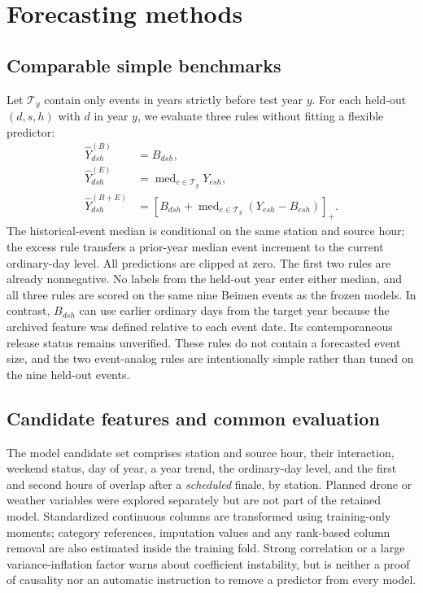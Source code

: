 \section{Forecasting methods}
\subsection{Comparable simple benchmarks}
Let $\mathcal T_y$ contain only events in years strictly before test year $y$. For each held-out $(d,s,h)$ with $d$ in year $y$, we evaluate three rules without fitting a flexible predictor:
\begin{align}
\widehat Y^{(B)}_{dsh}&=B_{dsh}, \label{eq:baseordinary}\\
\widehat Y^{(E)}_{dsh}&=\operatorname{med}_{e\in\mathcal T_y}Y_{esh}, \label{eq:baseevent}\\
\widehat Y^{(B+E)}_{dsh}&=
\left[B_{dsh}+\operatorname{med}_{e\in\mathcal T_y}
  (Y_{esh}-B_{esh})\right]_+ . \label{eq:baseincrement}
\end{align}
The historical-event median is conditional on the same station and source hour; the excess rule transfers a prior-year median event increment to the current ordinary-day level. All predictions are clipped at zero. The first two rules are already nonnegative. No labels from the held-out year enter either median, and all three rules are scored on the same nine Beimen events as the frozen models. In contrast, $B_{dsh}$ can use earlier ordinary days from the target year because the archived feature was defined relative to each event date. Its contemporaneous release status remains unverified. These rules do not contain a forecasted event size, and the two event-analog rules are intentionally simple rather than tuned on the nine held-out events.

\subsection{Candidate features and common evaluation}
The model candidate set comprises station and source hour, their interaction, weekend status, day of year, a year trend, the ordinary-day level, and the first and second hours of overlap after a \emph{scheduled} finale, by station. Planned drone or weather variables were explored separately but are not part of the retained model. Standardized continuous columns are transformed using training-only moments; category references, imputation values and any rank-based column removal are also estimated inside the training fold. Strong correlation or a large variance-inflation factor warns about coefficient instability, but is neither a proof of causality nor an automatic instruction to remove a predictor from every model.

